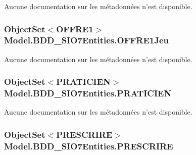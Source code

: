 Aucune documentation sur les métadonnées n'est disponible. 

\hypertarget{class_model_1_1_b_d_d___s_i_o7_entities_a3430fda13ad472d300b07c477b43b6b6}{
\subsubsection[{O\-F\-F\-R\-E1\-Jeu}]{\setlength{\rightskip}{0pt plus 5cm}Object\-Set$<${\bf O\-F\-F\-R\-E1}$>$ Model.\-B\-D\-D\-\_\-\-S\-I\-O7\-Entities.\-O\-F\-F\-R\-E1\-Jeu\hspace{0.3cm}{\ttfamily [get]}}}\label{class_model_1_1_b_d_d___s_i_o7_entities_a3430fda13ad472d300b07c477b43b6b6}


Aucune documentation sur les métadonnées n'est disponible. 

\hypertarget{class_model_1_1_b_d_d___s_i_o7_entities_aa7f5305d592739cf4e3805fcdb0277ae}{
\subsubsection[{P\-R\-A\-T\-I\-C\-I\-E\-N}]{\setlength{\rightskip}{0pt plus 5cm}Object\-Set$<${\bf P\-R\-A\-T\-I\-C\-I\-E\-N}$>$ Model.\-B\-D\-D\-\_\-\-S\-I\-O7\-Entities.\-P\-R\-A\-T\-I\-C\-I\-E\-N\hspace{0.3cm}{\ttfamily [get]}}}\label{class_model_1_1_b_d_d___s_i_o7_entities_aa7f5305d592739cf4e3805fcdb0277ae}


Aucune documentation sur les métadonnées n'est disponible. 

\hypertarget{class_model_1_1_b_d_d___s_i_o7_entities_a2f477606bede8c5cc3edbdddeb81ada8}{
\subsubsection[{P\-R\-E\-S\-C\-R\-I\-R\-E}]{\setlength{\rightskip}{0pt plus 5cm}Object\-Set$<${\bf P\-R\-E\-S\-C\-R\-I\-R\-E}$>$ Model.\-B\-D\-D\-\_\-\-S\-I\-O7\-Entities.\-P\-R\-E\-S\-C\-R\-I\-R\-E\hspace{0.3cm}{\ttfamily [get]}}}\label{class_model_1_1_b_d_d___s_i_o7_entities_a2f477606bede8c5cc3edbdddeb81ada8}


